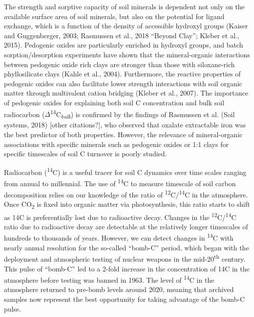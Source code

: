 \documentclass[english,man,floatsintext]{apa6}
\begin{document}
The strength and sorptive capacity of soil minerals is dependent not only on the available surface area of soil minerals, but also on the potential for ligand exchange, which is a function of the density of accessible hydroxyl groups (Kaiser and Guggenberger, 2003; Rasmussen et al., 2018 \enquote{Beyond Clay}; Kleber et al., 2015). Pedogenic oxides are particularly enriched in hydroxyl groups, and batch sorption/desorption experiments have shown that the mineral-organic interactions between pedogenic oxide rich clays are stronger than those with siloxane-rich phyllosilicate clays (Kahle et al., 2004). Furthermore, the reactive properties of pedogenic oxides can also facilitate lower strength interactions with soil organic matter through multivalent cation bridging (Kleber et al., 2007). The importance of pedogenic oxides for explaining both soil C concentration and bulk soil radiocarbon (\(\Delta\)\textsuperscript{14}C\textsubscript{\emph{bulk}}) is confirmed by the findings of Rasmussen et al. (Soil systems, 2018) {[}other citations?{]}, who observed that oxalate extractable iron was the best predictor of both properties. However, the relevance of mineral-organic associations with specific minerals such as pedogenic oxides or 1:1 clays for specific timescales of soil C turnover is poorly studied.

Radiocarbon (\textsuperscript{14}C) is a useful tracer for soil C dynamics over time scales ranging from annual to millennial. The use of \textsuperscript{14}C to measure timescale of soil carbon decomposition relies on our knowledge of the ratio of \textsuperscript{12}C/\textsuperscript{14}C in the atmosphere. Once CO\textsubscript{2} is fixed into organic matter via photosynthesis, this ratio starts to shift as 14C is preferentially lost due to radioactive decay. Changes in the \textsuperscript{12}C/\textsuperscript{14}C ratio due to radioactive decay are detectable at the relatively longer timescales of hundreds to thousands of years. However, we can detect changes in \textsuperscript{14}C with nearly annual resolution for the so-called \enquote{bomb-C} period, which began with the deployment and atmospheric testing of nuclear weapons in the mid-20\textsuperscript{th} century. This pulse of \enquote{bomb-C} led to a 2-fold increase in the concentration of 14C in the atmosphere before testing was banned in 1963. The level of \textsuperscript{14}C in the atmosphere returned to pre-bomb levels around 2020, meaning that archived samples now represent the best opportunity for taking advantage of the bomb-C pulse.
\end{document}
